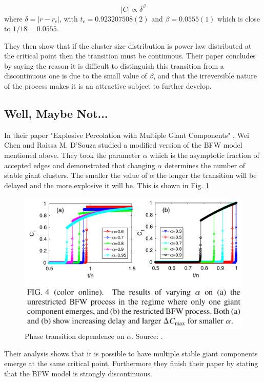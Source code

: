 \begin{equation}
	|C| \propto \delta^\beta
\end{equation}
where $\delta = |r - r_c|$, with $t_c = 0.923207508(2)$ and $\beta = 0.0555(1)$ which is close to $1/18 = 0.055\overline{5}$.

They then show that if the cluster size distribution is power law distributed at the critical point then the transition must be continuous.
Their paper concludes by saying the reason it is difficult to distinguish this transition from a discontinuous one is due to the small value of $\beta$, and that the irreversible nature of the process makes it is an attractive subject to further develop.



\subsection{Well, Maybe Not...}
In their paper "Explosive Percolation with Multiple Giant Components" \cite{Chen_1}, Wei Chen and Raissa M. D’Souza studied a modified version of the BFW model mentioned above.
They took the parameter $\alpha$ which is the asymptotic fraction of accepted edges and demonstrated that changing $\alpha$ determines the number of stable giant clusters.
The smaller the value of $\alpha$ the longer the transition will be delayed and the more explosive it will be.
This is shown in Fig. \ref{fig:bfw_alpha_comparison}

\begin{figure}[H]
	\centering
	\includegraphics[width=350pt]{images/bfw_alpha_comparison.png}
	\caption{Phase transition dependence on $\alpha$. Source: \cite{Chen_1}.}
	\label{fig:bfw_alpha_comparison}
\end{figure}

Their analysis shows that it is possible to have multiple stable giant components emerge at the same critical point.
Furthermore they finish their paper by stating that the BFW model is strongly discontinuous.



